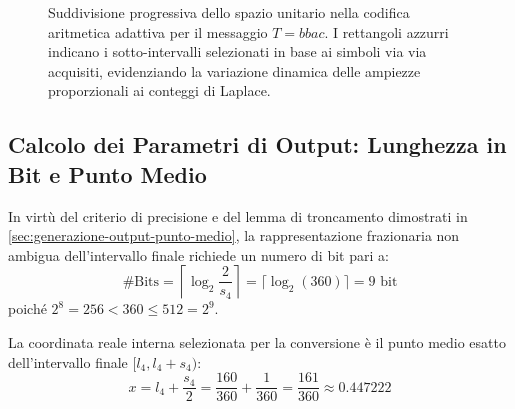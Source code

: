 \begin{figure}[H]
\caption{Suddivisione progressiva dello spazio unitario nella codifica aritmetica adattiva per il messaggio $T = bbac$. I rettangoli azzurri indicano i sotto-intervalli selezionati in base ai simboli via via acquisiti, evidenziando la variazione dinamica delle ampiezze proporzionali ai conteggi di Laplace.}
\label{fig:aritmetica-dinamica-subdivision}
\end{figure}

\FloatBarrier
\subsection{Calcolo dei Parametri di Output: Lunghezza in Bit e Punto Medio}
\label{subsec:output-lunghezza-punto-medio}

In virt\`u del criterio di precisione e del lemma di troncamento dimostrati in \autoref{sec:generazione-output-punto-medio}, la rappresentazione frazionaria non ambigua dell'intervallo finale richiede un numero di bit pari a:
\begin{equation}
  \#\text{Bits} = \left\lceil \log_2 \frac{2}{s_4} \right\rceil = \lceil \log_2(360) \rceil = 9 \text{ bit}
\end{equation}
poich\'e $2^8 = 256 < 360 \le 512 = 2^9$.

La coordinata reale interna selezionata per la conversione \`e il punto medio esatto dell'intervallo finale $[l_4, l_4 + s_4)$:
\begin{equation}
  x = l_4 + \frac{s_4}{2} = \frac{160}{360} + \frac{1}{360} = \frac{161}{360} \approx 0.447222
\end{equation}


